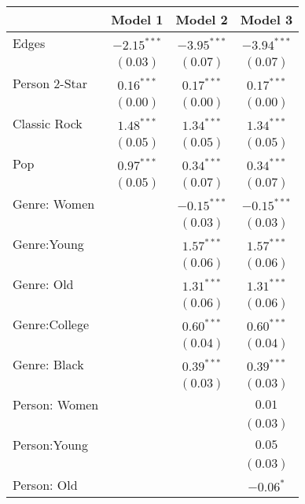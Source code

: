 
\begin{table}
\begin{center}
\begin{tabular}{l c c c}
\hline
 & Model 1 & Model 2 & Model 3 \\
\hline
Edges          & $-2.15^{***}$ & $-3.95^{***}$ & $-3.94^{***}$ \\
               & $(0.03)$      & $(0.07)$      & $(0.07)$      \\
Person 2-Star  & $0.16^{***}$  & $0.17^{***}$  & $0.17^{***}$  \\
               & $(0.00)$      & $(0.00)$      & $(0.00)$      \\
Classic Rock   & $1.48^{***}$  & $1.34^{***}$  & $1.34^{***}$  \\
               & $(0.05)$      & $(0.05)$      & $(0.05)$      \\
Pop            & $0.97^{***}$  & $0.34^{***}$  & $0.34^{***}$  \\
               & $(0.05)$      & $(0.07)$      & $(0.07)$      \\
Genre: Women   &               & $-0.15^{***}$ & $-0.15^{***}$ \\
               &               & $(0.03)$      & $(0.03)$      \\
Genre:Young    &               & $1.57^{***}$  & $1.57^{***}$  \\
               &               & $(0.06)$      & $(0.06)$      \\
Genre: Old     &               & $1.31^{***}$  & $1.31^{***}$  \\
               &               & $(0.06)$      & $(0.06)$      \\
Genre:College  &               & $0.60^{***}$  & $0.60^{***}$  \\
               &               & $(0.04)$      & $(0.04)$      \\
Genre: Black   &               & $0.39^{***}$  & $0.39^{***}$  \\
               &               & $(0.03)$      & $(0.03)$      \\
Person: Women  &               &               & $0.01$        \\
               &               &               & $(0.03)$      \\
Person:Young   &               &               & $0.05$        \\
               &               &               & $(0.03)$      \\
Person: Old    &               &               & $-0.06^{*}$   \\

\end{tabular}
\end{center}
\end{table}
